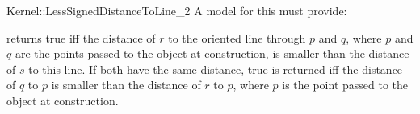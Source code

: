 \begin{ccRefFunctionObjectConcept}{Kernel::LessSignedDistanceToLine_2}
A model for this must provide:


{returns true iff the distance of $r$ to the oriented line 
through $p$ and $q$, where $p$ and $q$ are the points passed
to the object at construction, is smaller than the distance of
$s$ to this line. If both have the same distance, true is
returned iff the distance of $q$ to $p$ is
smaller than the distance of $r$ to $p$, where $p$ is the point
passed to the object at construction.}

\ccSeeAlso
{}\\

\end{ccRefFunctionObjectConcept}
